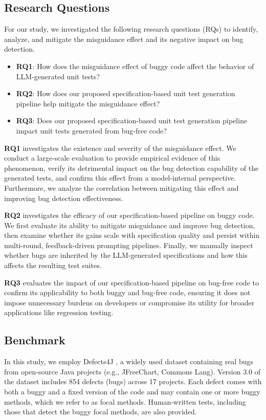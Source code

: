 \documentclass[acmsmall]{acmart}
\begin{document}
\subsection{Research Questions}
\label{subsec:research_questions}
For our study, we investigated the following research questions (RQs) to identify, analyze, and mitigate the misguidance effect and its negative impact on bug detection.
\begin{itemize}
    \item \textbf{RQ1}: How does the misguidance effect of buggy code affect the behavior of LLM-generated unit tests?
    \item \textbf{RQ2}: How does our proposed specification-based unit test generation pipeline help mitigate the misguidance effect?
    \item \textbf{RQ3}: Does our proposed specification-based unit test generation pipeline impact unit tests generated from bug-free code?
\end{itemize}
\noindent\textbf{RQ1} investigates the existence and severity of the misguidance effect. We conduct a large-scale evaluation to provide empirical evidence of this phenomenon, verify its detrimental impact on the bug detection capability of the generated tests, and confirm this effect from a model-internal perspective. Furthermore, we analyze the correlation between mitigating this effect and improving bug detection effectiveness.

\noindent\textbf{RQ2} investigates the efficacy of our specification-based pipeline on buggy code. We first evaluate its ability to mitigate misguidance and improve bug detection, then examine whether its gains scale with specification quality and persist within multi-round, feedback-driven prompting pipelines. Finally, we manually inspect whether bugs are inherited by the LLM-generated specifications and how this affects the resulting test suites.

\noindent\textbf{RQ3} evaluates the impact of our specification-based pipeline on bug-free code to confirm its applicability to both buggy and bug-free code, ensuring it does not impose unnecessary burdens on developers or compromise its utility for broader applications like regression testing.

\subsection{Benchmark}

In this study, we employ Defects4J \cite{Defects4j}, a widely used dataset containing real bugs from open-source Java projects (e.g., JFreeChart, Commons Lang). Version 3.0 of the dataset includes 854 defects (bugs) across 17 projects. Each defect comes with both a buggy and a fixed version of the code and may contain one or more buggy methods, which we refer to as focal methods. Human-written tests, including those that detect the buggy focal methods, are also provided.
\end{document}
